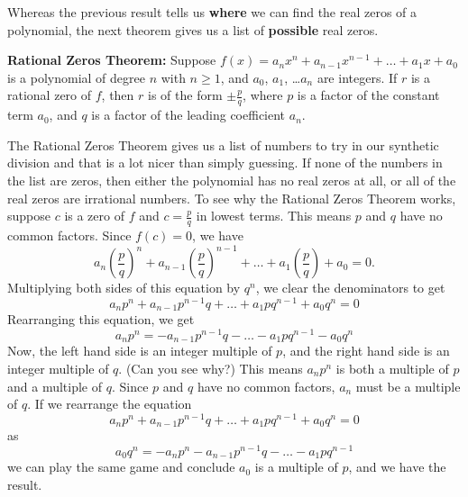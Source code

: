 \documentclass{ximera}
\begin{document}
Whereas the previous result tells us \textbf{where} we can find the real zeros of a polynomial, the next theorem gives us a list of \textbf{possible} real zeros.

\smallskip


\begin{theorem} \label{RZT}\textbf{Rational Zeros Theorem:}  Suppose $f(x) = a_{n} x^{n} + a_{n-1}x^{n-1} + \ldots + a_{1} x + a_0$ is a polynomial of degree $n$ with $n \geq 1$, and $a_0$, $a_{1}$, \ldots $a_{n}$ are integers.  If $r$ is a rational zero of $f$, then $r$ is of the form $\pm \frac{p}{q}$, where $p$ is a factor of the constant term $a_0$, and $q$ is a factor of the leading coefficient $a_{n}$.  
\end{theorem}


\smallskip

The Rational Zeros Theorem gives us a list of numbers to try in our synthetic division and that is a lot nicer than simply guessing.  If none of the numbers in the list are zeros, then either the polynomial has no real zeros at all, or all of the real zeros are irrational numbers.  To see why the Rational Zeros Theorem works, suppose $c$ is a zero of $f$ and $c = \frac{p}{q}$ in lowest terms.  This means $p$ and $q$ have no common factors.  Since $f(c) = 0$, we have \[a_{n} \left(\frac{p}{q}\right)^{n} + a_{n-1}\left(\frac{p}{q}\right)^{n-1} + \ldots + a_{1} \left(\frac{p}{q}\right) + a_0 = 0.\]  Multiplying both sides of this equation by $q^n$, we clear the denominators to get \[a_{n}p^{n} + a_{n-1}p^{n-1}q + \ldots + a_{1}p q^{n-1} + a_0q^n = 0\]  Rearranging this equation, we get  \[a_{n}p^{n} = -a_{n-1}p^{n-1}q - \ldots - a_{1}p q^{n-1} -a_0q^n\] Now, the left hand side is an integer multiple of $p$, and the right hand side is an integer multiple of $q$. (Can you see why?)  This means $a_{n}p^{n}$ is both a multiple of $p$ and a multiple of $q$.  Since $p$ and $q$ have no common factors, $a_{n}$ must be a multiple of $q$.  If we rearrange the equation \[a_{n}p^{n} + a_{n-1}p^{n-1}q + \ldots + a_{1}p q^{n-1} + a_0q^n = 0\] as \[a_0q^n = -a_{n}p^{n} - a_{n-1}p^{n-1}q - \ldots - a_{1}p q^{n-1}\] we can play the same game and conclude $a_0$ is a multiple of $p$, and we have the result.
\end{document}
